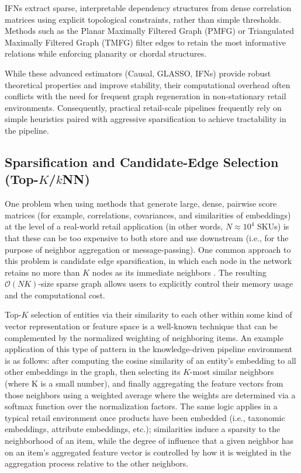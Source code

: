 IFNs extract sparse, interpretable dependency structures from dense correlation matrices using explicit topological constraints, rather than simple thresholds. Methods such as the Planar Maximally Filtered Graph (PMFG)\cite{tumminello2005pmfg} or Triangulated Maximally Filtered Graph (TMFG)\cite{massara2016tmfg} filter edges to retain the most informative relations while enforcing planarity or chordal structures.

While these advanced estimators (Causal, GLASSO, IFNs) provide robust theoretical properties and improve stability, their computational overhead often conflicts with the need for frequent graph regeneration in non-stationary retail environments. Consequently, practical retail-scale pipelines frequently rely on simple heuristics paired with aggressive sparsification to achieve tractability in the pipeline.

\subsection{Sparsification and Candidate-Edge Selection (Top-$K$/$k$NN)}
\label{subsec:sparsification_topk_knn}

One problem when using methods that generate large, dense, pairwise score matrices (for example, correlations, covariances, and similarities of embeddings) at the level of a real-world retail application (in other words, $N \approx 10^4$ \acp{SKU}) is that these can be too expensive to both store and use downstream (i.e., for the purpose of neighbor aggregation or message-passing). One common approach to this problem is candidate edge sparsification, in which each node in the network retains no more than $K$ nodes as its immediate neighbors \cite{wu2019graphwavenetdeepspatialtemporal, wu2020connectingdotsmultivariatetime}. The resulting $\mathcal{O}(NK)$-size sparse graph allows users to explicitly control their memory usage and the computational cost.

Top-$K$ selection of entities via their similarity to each other within some kind of vector representation or feature space is a well-known technique that can be complemented by the normalized weighting of neighboring items. An example application of this type of pattern in the knowledge-driven pipeline environment is as follows: after computing the cosine similarity of an entity's embedding to all other embeddings in the graph, then selecting its $K$-most similar neighbors (where K is a small number), and finally aggregating the feature vectors from those neighbors using a weighted average where the weights are determined via a softmax function over the normalization factors. The same logic applies in a typical retail environment once products have been embedded (i.e., taxonomic embeddings, attribute embeddings, etc.); similarities induce a sparsity to the neighborhood of an item, while the degree of influence that a given neighbor has on an item's aggregated feature vector is controlled by how it is weighted in the aggregation process relative to the other neighbors.

